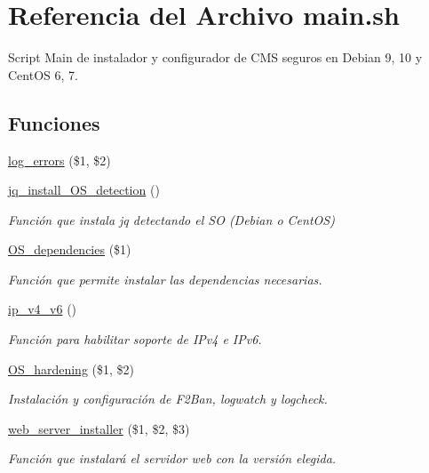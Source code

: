 \hypertarget{main_8sh}{}\section{Referencia del Archivo main.\+sh}
\label{main_8sh}


Script Main de instalador y configurador de C\+MS seguros en Debian 9, 10 y Cent\+OS 6, 7.  


\subsection*{Funciones}
\begin{DoxyCompactItemize}
\item 
\hyperlink{main_8sh_a92067b58a8478c9841b2cd9b75ea3565}{log\+\_\+errors} (\$1, \$2)
\item 
\mbox{\label{main_8sh_a14153ec632198b7643c2d2f1cff3471d}} 
\hyperlink{main_8sh_a14153ec632198b7643c2d2f1cff3471d}{jq\+\_\+install\+\_\+\+O\+S\+\_\+detection} ()
\begin{DoxyCompactList}\small\item\em Función que instala jq detectando el SO (Debian o Cent\+OS) \end{DoxyCompactList}\item 
\hyperlink{main_8sh_a48e8d18ccca665f9cd6bacd76dcd3d7d}{O\+S\+\_\+dependencies} (\$1)
\begin{DoxyCompactList}\small\item\em Función que permite instalar las dependencias necesarias. \end{DoxyCompactList}\item 
\hyperlink{main_8sh_a7257eec52c0bd74e8cf1d671c0cba810}{ip\+\_\+v4\+\_\+v6} ()
\begin{DoxyCompactList}\small\item\em Función para habilitar soporte de I\+Pv4 e I\+Pv6. \end{DoxyCompactList}\item 
\hyperlink{main_8sh_acd33682741fa52b482fbeb09846bd3cb}{O\+S\+\_\+hardening} (\$1, \$2)
\begin{DoxyCompactList}\small\item\em Instalación y configuración de F2\+Ban, logwatch y logcheck. \end{DoxyCompactList}\item 
\hyperlink{main_8sh_a8fbc4bde96d235c9985b0d1697e1b552}{web\+\_\+server\+\_\+installer} (\$1, \$2, \$3)
\begin{DoxyCompactList}\small\item\em Función que instalará el servidor web con la versión elegida. \end{DoxyCompactList}\item 

\end{DoxyCompactItemize}
